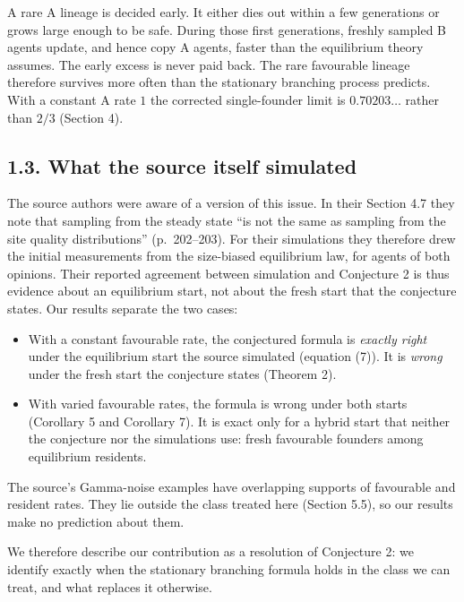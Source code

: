 \documentclass[
  british,
  11pt,
  a4paper,
]{article}
\providecommand{\tightlist}{%
  \setlength{\itemsep}{0pt}\setlength{\parskip}{0pt}}
\begin{document}
A rare A lineage is decided early. It either dies out within a few
generations or grows large enough to be safe. During those first
generations, freshly sampled B agents update, and hence copy A agents,
faster than the equilibrium theory assumes. The early excess is never
paid back. The rare favourable lineage therefore survives more often
than the stationary branching process predicts. With a constant A rate
\(1\) the corrected single-founder limit is \(0.70203\ldots\) rather
than \(2/3\) (Section 4).

\subsection{1.3. What the source itself
simulated}\label{what-the-source-itself-simulated}

The source authors were aware of a version of this issue. In their
Section 4.7 they note that sampling from the steady state ``is not the
same as sampling from the site quality distributions'' (p.~202--203).
For their simulations they therefore drew the initial measurements from
the size-biased equilibrium law, for agents of both opinions. Their
reported agreement between simulation and Conjecture 2 is thus evidence
about an equilibrium start, not about the fresh start that the
conjecture states. Our results separate the two cases:

\begin{itemize}
\tightlist
\item
  With a constant favourable rate, the conjectured formula is
  \emph{exactly right} under the equilibrium start the source simulated
  (equation (7)). It is \emph{wrong} under the fresh start the
  conjecture states (Theorem 2).
\item
  With varied favourable rates, the formula is wrong under both starts
  (Corollary 5 and Corollary 7). It is exact only for a hybrid start
  that neither the conjecture nor the simulations use: fresh favourable
  founders among equilibrium residents.
\end{itemize}

The source's Gamma-noise examples have overlapping supports of
favourable and resident rates. They lie outside the class treated here
(Section 5.5), so our results make no prediction about them.

We therefore describe our contribution as a resolution of Conjecture 2:
we identify exactly when the stationary branching formula holds in the
class we can treat, and what replaces it otherwise.
\end{document}
